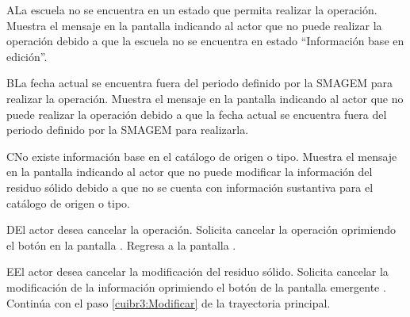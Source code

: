     \begin{UCtrayectoriaA}{A}{La escuela no se encuentra en un estado que permita realizar la operación.}
    \UCpaso[\UCsist] Muestra el mensaje  en la pantalla  indicando al actor que no puede realizar la operación debido a que la escuela no se encuentra en estado ``Información base en edición''. 
 \end{UCtrayectoriaA}

   \begin{UCtrayectoriaA}{B}{La fecha actual se encuentra fuera del periodo definido por la SMAGEM para realizar la operación.}
    \UCpaso[\UCsist] Muestra el mensaje  en la pantalla  indicando al actor que no puede realizar la operación debido a que la fecha actual se encuentra fuera del periodo definido por la SMAGEM para realizarla. 
 \end{UCtrayectoriaA}
 
 \begin{UCtrayectoriaA}{C}{No existe información base en el catálogo de origen o tipo.}
    \UCpaso[\UCsist] Muestra el mensaje  en la pantalla  indicando al actor que no puede modificar la información del residuo sólido debido a que no se cuenta con información sustantiva para el catálogo de origen o tipo.
 \end{UCtrayectoriaA}
 
    \begin{UCtrayectoriaA}{D}{El actor desea cancelar la operación.}
    \UCpaso[\UCactor] Solicita cancelar la operación oprimiendo el botón  en la pantalla .
    \UCpaso[] Regresa a la pantalla . 
    \end{UCtrayectoriaA}
 
    \begin{UCtrayectoriaA}{E}{El actor desea cancelar la modificación del residuo sólido.}
    \UCpaso[\UCactor] Solicita cancelar la modificación de la información oprimiendo el botón  de la pantalla emergente .
    \UCpaso[] Continúa con el paso \ref{cuibr3:Modificar} de la trayectoria principal.    
 \end{UCtrayectoriaA}
 
